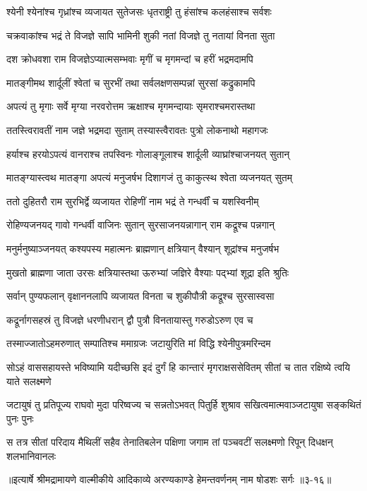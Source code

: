 \twolineshloka
{श्येनी श्येनांश्च गृध्रांश्च व्यजायत सुतेजसः}
{धृतराष्ट्री तु हंसांश्च कलहंसाश्च सर्वशः} %

\twolineshloka
{चक्रवाकांश्च भद्रं ते विजज्ञे सापि भामिनी}
{शुकी नतां विजज्ञे तु नतायां विनता सुता} %

\twolineshloka
{दश क्रोधवशा राम विजज्ञेऽप्यात्मसम्भवाः}
{मृगीं च मृगमन्दां च हरीं भद्रमदामपि} %

\twolineshloka
{मातङ्गीमथ शार्दूलीं श्वेतां च सुरभीं तथा}
{सर्वलक्षणसम्पन्नां सुरसां कद्रुकामपि} %

\twolineshloka
{अपत्यं तु मृगाः सर्वे मृग्या नरवरोत्तम}
{ऋक्षाश्च मृगमन्दायाः सृमराश्चमरास्तथा} %

\twolineshloka
{ततस्त्विरावतीं नाम जज्ञे भद्रमदा सुताम्}
{तस्यास्त्वैरावतः पुत्रो लोकनाथो महागजः} %

\twolineshloka
{हर्याश्च हरयोऽपत्यं वानराश्च तपस्विनः}
{गोलाङ्गूलाश्च शार्दूली व्याघ्रांश्चाजनयत् सुतान्} %

\twolineshloka
{मातङ्ग्यास्त्वथ मातङ्गा अपत्यं मनुजर्षभ}
{दिशागजं तु काकुत्स्थ श्वेता व्यजनयत् सुतम्} %

\twolineshloka
{ततो दुहितरौ राम सुरभिर्द्वे व्यजायत}
{रोहिणीं नाम भद्रं ते गन्धर्वीं च यशस्विनीम्} %

\twolineshloka
{रोहिण्यजनयद् गावो गन्धर्वी वाजिनः सुतान्}
{सुरसाजनयन्नागान् राम कद्रूश्च पन्नगान्} %

\twolineshloka
{मनुर्मनुष्याञ्जनयत् कश्यपस्य महात्मनः}
{ब्राह्मणान् क्षत्रियान् वैश्यान् शूद्रांश्च मनुजर्षभ} %

\twolineshloka
{मुखतो ब्राह्मणा जाता उरसः क्षत्रियास्तथा}
{ऊरुभ्यां जज्ञिरे वैश्याः पद्भ्यां शूद्रा इति श्रुतिः} %

\twolineshloka
{सर्वान् पुण्यफलान् वृक्षाननलापि व्यजायत}
{विनता च शुकीपौत्री कद्रूश्च सुरसास्वसा} %

\twolineshloka
{कद्रूर्नागसहस्रं तु विजज्ञे धरणीधरान्}
{द्वौ पुत्रौ विनतायास्तु गरुडोऽरुण एव च} %

\twolineshloka
{तस्माज्जातोऽहमरुणात् सम्पातिश्च ममाग्रजः}
{जटायुरिति मां विद्धि श्येनीपुत्रमरिन्दम} %

\threelineshloka
{सोऽहं वाससहायस्ते भविष्यामि यदीच्छसि}
{इदं दुर्गं हि कान्तारं मृगराक्षससेवितम्}
{सीतां च तात रक्षिष्ये त्वयि याते सलक्ष्मणे} %

\twolineshloka
{जटायुषं तु प्रतिपूज्य राघवो मुदा परिष्वज्य च सन्नतोऽभवत्}
{पितुर्हि शुश्राव सखित्वमात्मवाञ्जटायुषा सङ्कथितं पुनः पुनः} %

\twolineshloka
{स तत्र सीतां परिदाय मैथिलीं सहैव तेनातिबलेन पक्षिणा}
{जगाम तां पञ्चवटीं सलक्ष्मणो रिपून् दिधक्षन् शलभानिवानलः} %


॥इत्यार्षे श्रीमद्रामायणे वाल्मीकीये आदिकाव्ये अरण्यकाण्डे हेमन्तवर्णनम् नाम षोडशः सर्गः ॥३-१६॥
